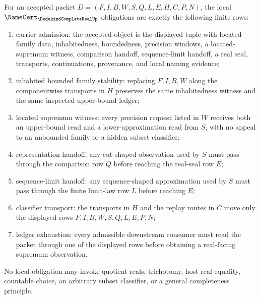 \begin{theorem}
\label{thm:dedekind-complete-real-namecert-obligation-surface}
For an accepted packet $D=(F,I,B,W,S,Q,L,E,H,C,P,N)$, the local $\NameCert_{\DedekindCompleteRealUp}$ obligations are exactly the following finite rows:
\begin{enumerate}
\item carrier admission: the accepted object is the displayed tuple with located family data, inhabitedness, boundedness, precision windows, a located-supremum witness, comparison handoff, sequence-limit handoff, a real seal, transports, continuations, provenance, and local naming evidence;
\item inhabited bounded family stability: replacing $F,I,B,W$ along the componentwise transports in $H$ preserves the same inhabitedness witness and the same inspected upper-bound ledger;
\item located supremum witness: every precision request listed in $W$ receives both an upper-bound read and a lower-approximation read from $S$, with no appeal to an unbounded family or a hidden subset classifier;
\item representation handoff: any cut-shaped observation used by $S$ must pass through the comparison row $Q$ before reaching the real-seal row $E$;
\item sequence-limit handoff: any sequence-shaped approximation used by $S$ must pass through the finite limit-law row $L$ before reaching $E$;
\item classifier transport: the transports in $H$ and the replay routes in $C$ move only the displayed rows $F,I,B,W,S,Q,L,E,P,N$;
\item ledger exhaustion: every admissible downstream consumer must read the packet through one of the displayed rows before obtaining a real-facing supremum observation.
\end{enumerate}
No local obligation may invoke quotient reals, trichotomy, host real equality, countable choice, an arbitrary subset classifier, or a general completeness principle.
\end{theorem}
